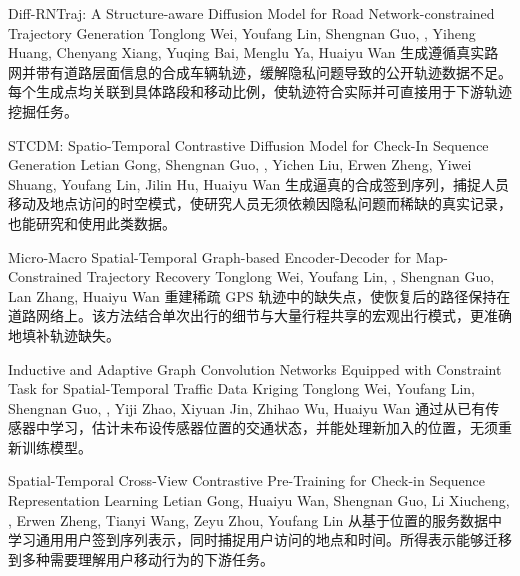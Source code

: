 {Diff-RNTraj: A Structure-aware Diffusion Model for Road Network-constrained Trajectory Generation}
{Tonglong Wei, Youfang Lin, Shengnan Guo, \me, Yiheng Huang, Chenyang Xiang, Yuqing Bai, Menglu Ya, Huaiyu Wan}
{生成遵循真实路网并带有道路层面信息的合成车辆轨迹，缓解隐私问题导致的公开轨迹数据不足。每个生成点均关联到具体路段和移动比例，使轨迹符合实际并可直接用于下游轨迹挖掘任务。}

{STCDM: Spatio-Temporal Contrastive Diffusion Model for Check-In Sequence Generation}
{Letian Gong, Shengnan Guo, \me, Yichen Liu, Erwen Zheng, Yiwei Shuang, Youfang Lin, Jilin Hu, Huaiyu Wan}
{生成逼真的合成签到序列，捕捉人员移动及地点访问的时空模式，使研究人员无须依赖因隐私问题而稀缺的真实记录，也能研究和使用此类数据。}

{Micro-Macro Spatial-Temporal Graph-based Encoder-Decoder for Map-Constrained Trajectory Recovery}
{Tonglong Wei, Youfang Lin, \me, Shengnan Guo, Lan Zhang, Huaiyu Wan}
{重建稀疏 GPS 轨迹中的缺失点，使恢复后的路径保持在道路网络上。该方法结合单次出行的细节与大量行程共享的宏观出行模式，更准确地填补轨迹缺失。}

{Inductive and Adaptive Graph Convolution Networks Equipped with Constraint Task for Spatial-Temporal Traffic Data Kriging}
{Tonglong Wei, Youfang Lin, Shengnan Guo, \me, Yiji Zhao, Xiyuan Jin, Zhihao Wu, Huaiyu Wan}
{通过从已有传感器中学习，估计未布设传感器位置的交通状态，并能处理新加入的位置，无须重新训练模型。}

{Spatial-Temporal Cross-View Contrastive Pre-Training for Check-in Sequence Representation Learning}
{Letian Gong, Huaiyu Wan, Shengnan Guo, Li Xiucheng, \me, Erwen Zheng, Tianyi Wang, Zeyu Zhou, Youfang Lin}
{从基于位置的服务数据中学习通用用户签到序列表示，同时捕捉用户访问的地点和时间。所得表示能够迁移到多种需要理解用户移动行为的下游任务。}

